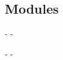\subsection{Modules\label{Markup--modules}}%
\begin{description}\kern-\topsep
\makeatletter\advance\@topsepadd-\topsep\makeatother%
\item[{\hyperref[Markup-X]{\ocamlinlinecode{\ocamlinlinecode{X}}[p\pageref*{Markup-X}]}}]{}\end{description}%
\begin{description}\kern-\topsep
\makeatletter\advance\@topsepadd-\topsep\makeatother%
\item[{\hyperref[Markup-X]{\ocamlinlinecode{\ocamlinlinecode{X}}[p\pageref*{Markup-X}]}}]{}%
\item[{\hyperref[Markup-Y]{\ocamlinlinecode{\ocamlinlinecode{Y}}[p\pageref*{Markup-Y}]}}]{}\end{description}%
